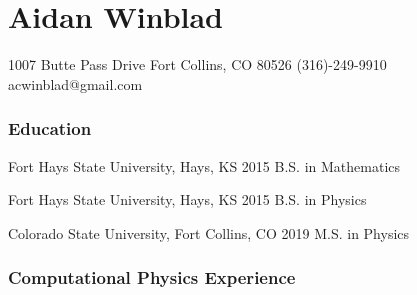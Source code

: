 \documentclass[11pt]{tccv}
\begin{document}
\part{Aidan Winblad}

\personal
    {1007 Butte Pass Drive \newline Fort Collins, CO 80526}
    {(316)-249-9910}
    {acwinblad@gmail.com}

\section{Education}

\begin{yearlist}

  \item[Fort Hays State University, Hays, KS]
    {2015}
    {B.S. in Mathematics}

  \item[Fort Hays State University, Hays, KS]
    {2015}
    {B.S. in Physics}

  \item[Colorado State University, Fort Collins, CO]
    {2019}
    {M.S. in Physics}

\end{yearlist}

\section{Computational Physics Experience}
\end{document}
